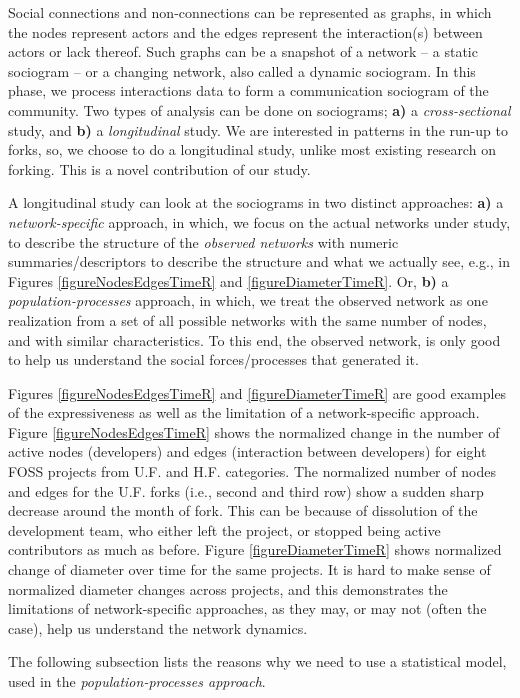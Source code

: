 \documentclass[11pt]{report}
\begin{document}
Social connections and non-connections can be represented as graphs, in which the nodes represent actors and the edges represent the interaction(s) between actors or lack thereof. Such graphs can be a snapshot of a network -- a static sociogram -- or a changing network, also called a dynamic sociogram. In this phase, we process interactions data to form a communication sociogram of the community. Two types of analysis can be done on sociograms; \textbf{a)} a \textit{cross-sectional} study, and \textbf{b)} a \textit{longitudinal} study. We are interested in patterns in the run-up to forks, so, we choose to do a longitudinal study, unlike most existing research on forking. This is a novel contribution of our study.

A longitudinal study can look at the sociograms in two distinct approaches: \textbf{a)} a \textit{network-specific} approach, in which, we focus on the actual networks under study, to describe the structure of the \textit{observed networks} with numeric summaries/descriptors to describe the structure and what we actually see, e.g., in Figures \ref{figureNodesEdgesTimeR} and \ref{figureDiameterTimeR}. Or, \textbf{b)} a \textit{population-processes} approach, in which, we treat the observed network as one realization from a set of all possible networks with the same number of nodes, and with similar characteristics. To this end, the observed network, is only good to help us understand the social forces/processes that generated it.

Figures \ref{figureNodesEdgesTimeR} and \ref{figureDiameterTimeR} are good examples of the expressiveness as well as the limitation of a network-specific approach. Figure \ref{figureNodesEdgesTimeR} shows the normalized change in the number of active nodes (developers) and edges (interaction between developers) for eight FOSS projects from U.F. and H.F. categories. The normalized number of nodes and edges for the U.F. forks (i.e., second and third row) show a sudden sharp decrease around the month of fork. This can be because of dissolution of the development team, who either left the project, or stopped being active contributors as much as before. Figure  \ref{figureDiameterTimeR} shows normalized change of diameter over time for the same projects. It is hard to make sense of normalized diameter changes across projects, and this demonstrates the limitations of network-specific approaches, as they may, or may not (often the case), help us understand the network dynamics.

The following subsection lists the reasons why we need to use a statistical model, used in the \textit{population-processes approach}.
\end{document}
